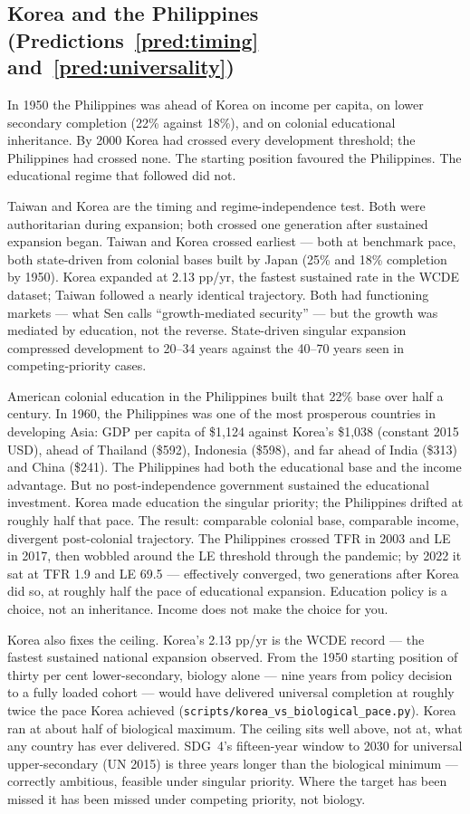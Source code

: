 \documentclass[12pt,letterpaper]{article}
\begin{document}
\subsection{Korea and the Philippines (Predictions~\ref{pred:timing} and~\ref{pred:universality})}\label{korea-and-philippines}

In 1950 the Philippines was ahead of Korea on income per capita, on lower secondary completion (22\% against 18\%), and on colonial educational inheritance. By 2000 Korea had crossed every development threshold; the Philippines had crossed none. The starting position favoured the Philippines. The educational regime that followed did not.

Taiwan and Korea are the timing and regime-independence test. Both
were authoritarian during expansion; both crossed one generation after
sustained expansion began. Taiwan and Korea crossed earliest --- both
at benchmark pace, both state-driven from colonial bases built by
Japan (25\% and 18\% completion by 1950). Korea expanded at 2.13 pp/yr, the fastest sustained
rate in the WCDE dataset; Taiwan followed a nearly identical trajectory.
Both had functioning markets --- what Sen calls ``growth-mediated
security'' --- but the growth was mediated by education, not the reverse.
State-driven singular expansion compressed development to 20--34 years
against the 40--70 years seen in competing-priority cases.

American colonial education in the
Philippines built that 22\% base over half a century. In 1960, the Philippines was one of the
most prosperous countries in developing Asia: GDP per capita of \$1,124
against Korea's \$1,038 (constant 2015 USD), ahead of Thailand (\$592),
Indonesia (\$598), and far ahead of India (\$313) and China (\$241). The
Philippines had both the educational base and the income advantage. But
no post-independence government sustained the educational investment.
Korea made education the singular priority;
the Philippines drifted at roughly half that pace. The result: comparable colonial base, comparable income, divergent
post-colonial trajectory. The Philippines crossed TFR in 2003 and LE in 2017, then wobbled around the LE threshold through the pandemic; by 2022 it sat at TFR 1.9 and LE 69.5 --- effectively converged, two generations after Korea did so, at roughly half the pace of educational expansion. Education policy is a choice, not an inheritance. Income does not make the choice for you.

Korea also fixes the ceiling. Korea's 2.13 pp/yr is the WCDE
record --- the fastest sustained national expansion observed.
From the 1950 starting position of thirty per cent lower-secondary,
biology alone --- nine years from policy decision to a fully
loaded cohort --- would have delivered universal completion at
roughly twice the pace Korea achieved
(\nolinkurl{scripts/korea_vs_biological_pace.py}). Korea ran at
about half of biological maximum. The ceiling sits well above,
not at, what any country has ever delivered. SDG~4's fifteen-year
window to 2030 for universal upper-secondary (UN 2015) is three
years longer than the biological minimum --- correctly ambitious,
feasible under singular priority. Where the target has been
missed it has been missed under competing priority, not biology.
\end{document}

